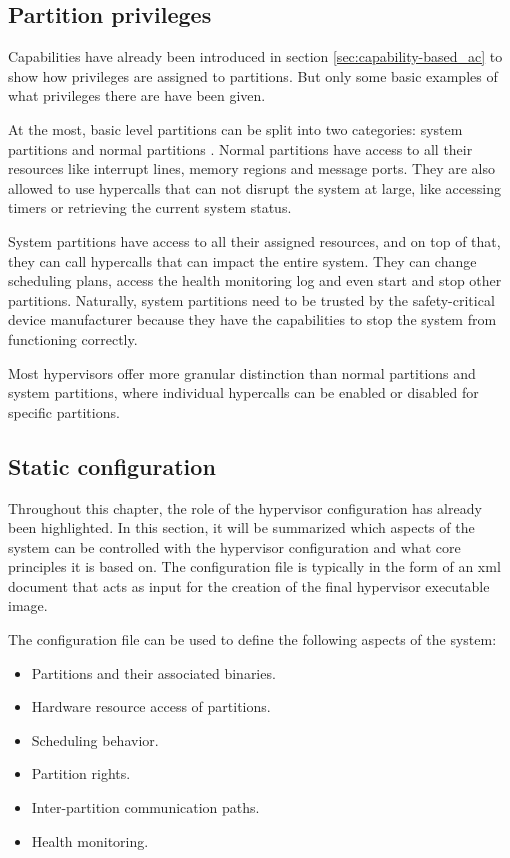 \subsection{Partition privileges}
Capabilities have already been introduced in section \ref{sec:capability-based_ac} to show how privileges are assigned to partitions. But only some basic examples of what privileges there are have been given. 

At the most, basic level partitions can be split into two categories: system partitions and normal partitions \cite{xtratum3}. Normal partitions have access to all their resources like interrupt lines, memory regions and message ports. They are also allowed to use hypercalls that can not disrupt the system at large, like accessing timers or retrieving the current system status.

System partitions have access to all their assigned resources, and on top of that, they can call hypercalls that can impact the entire system. They can change scheduling plans, access the health monitoring log and even start and stop other partitions. Naturally, system partitions need to be trusted by the safety-critical device manufacturer because they have the capabilities to stop the system from functioning correctly.

Most hypervisors offer more granular distinction than normal partitions and system partitions, where individual hypercalls can be enabled or disabled for specific partitions.
\subsection{Static configuration}
Throughout this chapter, the role of the hypervisor configuration has already been highlighted. In this section, it will be summarized which aspects of the system can be controlled with the hypervisor configuration and what core principles it is based on. The configuration file is typically in the form of an \acrshort{xml} document that acts as input for the creation of the final hypervisor executable image.

The configuration file can be used to define the following aspects of the system:
\begin{itemize}
    \item Partitions and their associated binaries.
    \item Hardware resource access of partitions.
    \item Scheduling behavior.
    \item Partition rights.
    \item Inter-partition communication paths.
    \item Health monitoring.
\end{itemize}


